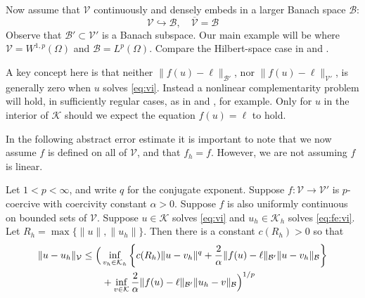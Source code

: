 \documentclass[hidelinks,onefignum,onetabnum,final]{siamart220329}  %
\newcommand{\cB}{\mathcal{B}}
\newcommand{\cK}{\mathcal{K}}
\newcommand{\cV}{\mathcal{V}}
\begin{document}
Now assume that $\cV$ continuously and densely embeds in a larger Banach space $\cB$:
\begin{equation}
\cV \hookrightarrow \cB, \quad \overline{\cV} = \cB
\end{equation}
Observe that $\cB' \subset \cV'$ is a Banach subspace.  Our main example will be where $\cV=W^{1,p}(\Omega)$ and $\cB=L^p(\Omega)$.  Compare the Hilbert-space case in \cite{Falk1974} and \cite[section 5.1]{Ciarlet2002}.

A key concept here is that neither $\|f(u)-\ell\|_{\cB'}$, nor $\|f(u)-\ell\|_{\cV'}$, is generally zero when $u$ solves \eqref{eq:vi}.  Instead a nonlinear complementarity problem will hold, in sufficiently regular cases, as in \cite[Exercise 5.1.1]{Ciarlet2002}  and \cite[section 7]{BuelerFarrell2024}, for example.  Only for $u$ in the interior of $\cK$ should we expect the equation $f(u)=\ell$ to hold.

In the following abstract error estimate it is important to note that we now assume $f$ is defined on all of $\cV$, and that $f_h=f$.  However, we are not assuming $f$ is linear.

\begin{theorem} \label{thm:abstractestimate}
Let $1<p<\infty$, and write $q$ for the conjugate exponent.  Suppose $f:\cV \to \cV'$ is $p$-coercive with coercivity constant $\alpha>0$.  Suppose $f$ is also uniformly continuous on bounded sets of $\cV$.  Suppose $u\in\cK$ solves \eqref{eq:vi} and $u_h\in\cK_h$ solves \eqref{eq:fe:vi}.  Let $R_h=\max\{\|u\|,\|u_h\|\}$.  Then there is a constant $c(R_h)>0$ so that
\begin{align}
\|u-u_h\|_{\cV} &\le \Big(\inf_{v_h\in\cK_h} \left\{c(R_h) \|u - v_h\|^q + \frac{2}{\alpha} \|f(u)-\ell\|_{\cB'} \|u-v_h\|_{\cB}\right\} \label{eq:abstractestimate} \\
   &\qquad + \inf_{v\in\cK} \frac{2}{\alpha} \|f(u)-\ell\|_{\cB'} \|u_h-v\|_{\cB}\Big)^{1/p} \notag
\end{align}
\end{theorem}
\end{document}

